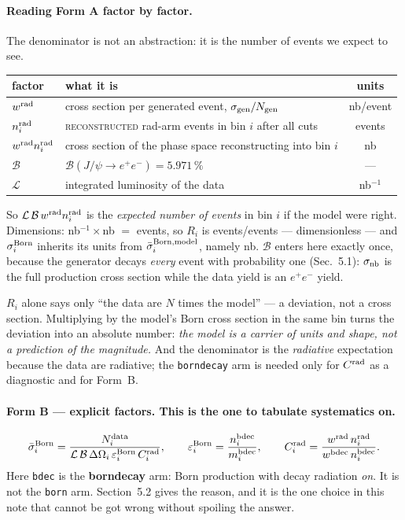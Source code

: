 \documentclass[11pt]{article}
\newcommand{\crad}{C^{\rm rad}}
\newcommand{\Lum}{\mathcal{L}}
\newcommand{\BR}{\mathcal{B}}
\begin{document}
\paragraph{Reading Form A factor by factor.}
The denominator is not an abstraction: it is the number of events we expect to see.

\begin{center}\small
\begin{tabular}{llc}
\toprule
factor & what it is & units \\
\midrule
$w^{\rm rad}$ & cross section per generated event, $\sigma_{\rm gen}/N_{\rm gen}$ & nb/event \\
$n_i^{\rm rad}$ & \textsc{reconstructed} rad-arm events in bin $i$ after all cuts & events \\
$w^{\rm rad}n_i^{\rm rad}$ & cross section of the phase space reconstructing into bin $i$ & nb \\
$\BR$ & $\BR(J/\psi\to e^+e^-)=5.971\,\%$ & --- \\
$\Lum$ & integrated luminosity of the data & nb$^{-1}$ \\
\bottomrule
\end{tabular}
\end{center}

So $\Lum\,\BR\,w^{\rm rad}n_i^{\rm rad}$ is the \emph{expected number of events} in bin $i$ if the
model were right. Dimensions: nb$^{-1}\times$nb $=$ events, so $R_i$ is events/events ---
dimensionless --- and $\sigma_i^{\rm Born}$ inherits its units from
$\bar\sigma_i^{\rm Born,model}$, namely nb. $\BR$ enters here exactly once, because the generator
decays \emph{every} event with probability one (Sec.~5.1): $\sigma_{\rm nb}$ is the full production
cross section while the data yield is an $e^+e^-$ yield.

$R_i$ alone says only ``the data are $N$ times the model'' --- a deviation, not a cross section.
Multiplying by the model's Born cross section in the same bin turns the deviation into an absolute
number: \emph{the model is a carrier of units and shape, not a prediction of the magnitude.} And the
denominator is the \emph{radiative} expectation because the data are radiative; the
\texttt{borndecay} arm is needed only for $\crad$ as a diagnostic and for Form~B.

\paragraph{Form B --- explicit factors. This is the one to tabulate systematics on.}
\begin{equation}
\bar\sigma_i^{\rm Born}
=\frac{N_i^{\rm data}}{\Lum\,\BR\,\Delta\Omega_i\,\varepsilon_i^{\rm Born}\,\crad_i},
\qquad
\varepsilon_i^{\rm Born}=\frac{n_i^{\rm bdec}}{m_i^{\rm bdec}},
\qquad
\crad_i=\frac{w^{\rm rad}\,n_i^{\rm rad}}{w^{\rm bdec}\,n_i^{\rm bdec}}.
\label{eq:formB}
\end{equation}
Here \texttt{bdec} is the \textbf{borndecay} arm: Born production with decay radiation \emph{on}.
It is not the \texttt{born} arm. Section~5.2 gives the reason, and it is the one choice in this note
that cannot be got wrong without spoiling the answer.
\end{document}
